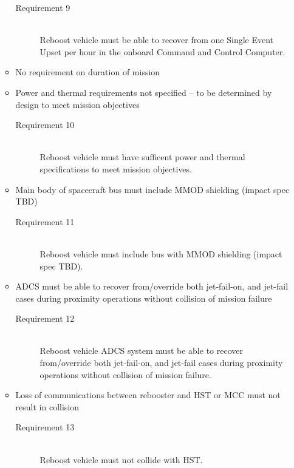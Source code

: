 \documentclass[onecolumn,10pt]{jhwhw}
\begin{document}
\begin{enumerate}
\begin{itemize}
\begin{description}
  \item[Requirement 9] \hfill \\
  Reboost vehicle must be able to recover from one Single Event Upset per hour in the onboard Command and Control Computer.
\end{description}
\item No requirement on duration of mission
\item Power and thermal requirements not specified – to be determined by design to meet mission objectives
\begin{description}
  \item[Requirement 10] \hfill \\
  Reboost vehicle must have sufficent power and thermal specifications to meet mission objectives.
\end{description}
\item Main body of spacecraft bus must include MMOD shielding (impact spec TBD)
\begin{description}
  \item[Requirement 11] \hfill \\
  Reboost vehicle must include bus with MMOD shielding (impact spec TBD).
\end{description}
\item ADCS must be able to recover from/override both jet-fail-on, and jet-fail cases during proximity operations without collision of mission failure
\begin{description}
  \item[Requirement 12] \hfill \\
  Reboost vehicle ADCS system must be able to recover from/override both jet-fail-on, and jet-fail cases during proximity operations without collision of mission failure.
\end{description}
\item Loss of communications between rebooster and HST or MCC must not result in collision
\begin{description}
  \item[Requirement 13] \hfill \\
  Reboost vehicle must not collide with HST.
\end{description}
\end{itemize}
\end{enumerate}
\end{document}
